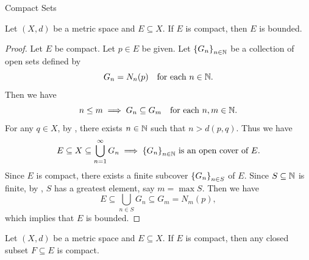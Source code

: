 \begin{section}{Compact Sets}
\bigskip

\begin{theorem} \label{thm:CompactSetIsBounded}
    Let $(X, d)$ be a metric space and $E \subseteq X$. If $E$ is compact, then $E$ is bounded.
\end{theorem}

\begin{proof}
    Let $E$ be compact. Let $p \in E$ be given. Let $\set*{G_{n}}_{n \in \N}$ be a collection of open sets defined by
    \[
    G_{n} = N_{n}(p) \quad \text{for each } n \in \N.
    \]
    Then we have
    \[
    n \leq m \implies G_{n} \subseteq G_{m} \quad \text{for each } n, m \in \N.
    \]
    For any $q \in X$, by , there exists $n \in \N$ such that $n > d(p, q)$. Thus we have
    \[
    E \subseteq X \subseteq \bigcup_{n = 1}^{\infty} G_{n} \implies \set*{G_{n}}_{n \in \N} \text{ is an open cover of } E.
    \]
    Since $E$ is compact, there exists a finite subcover $\set*{G_{n}}_{n \in S}$ of $E$. Since $S \subseteq \N$ is finite,
    by , $S$ has a greatest element, say $m = \max S$. Then we have
    \[
    E \subseteq \bigcup_{n \in S} G_{n} \subseteq G_{m} = N_{m}(p),
    \]
    which implies that $E$ is bounded.
\end{proof}

\bigskip

\begin{theorem} \label{thm:ClosedSubsetOfCompactSetIsCompact}
    Let $(X, d)$ be a metric space and $E \subseteq X$. If $E$ is compact, then any closed subset $F \subseteq E$ is compact.
\end{theorem}


\end{section}
